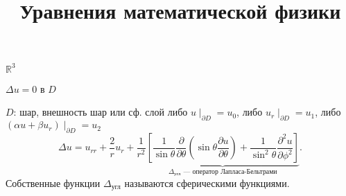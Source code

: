 \documentclass[a4paper]{article}
\title{Уравнения математической физики}
\begin{document}
    \maketitle
    \tableofcontents
    $\mathbb{R}^3$

    $\Delta u = 0 $ в $D$ 

    $D$: шар, внешность шар или сф. слой
    либо $u \mid _{\partial D}= u_0$, либо $u_r \mid _{\partial D}=u_1$, либо $(\alpha u +\beta u_r)\mid _{\partial D}=u_2$
   \[
   \Delta u = u_{rr}+ \frac{2}{r} u_r+ \frac{1}{r^2}\underbrace{\left[ 
   \frac{1}{\sin \theta} \frac{\partial }{\partial \theta} \left( 
   \sin \theta \frac{\partial u}{\partial \theta} \right) +
   \frac{1}{\sin^2 \theta} \frac{\partial ^2u}{\partial \phi^2} \right]}_{\Delta _{\text{угл}} \text{ --- оператор Лапласа-Бельтрами}} 
   .\] 
   Собственные функции $\Delta_\text{угл}$ называются сферическими
   функциями.
\end{document}
